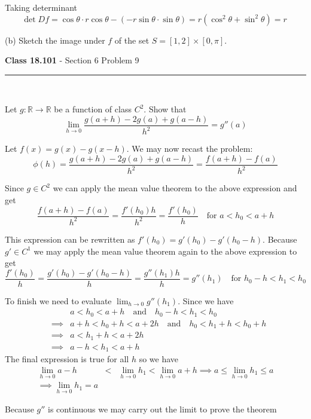 \documentclass[11pt,reqno]{article}
\begin{document}
\noindent Taking determinant
\[ \text{det} \; D f = \cos \theta \cdot r \cos \theta - ( - r \sin \theta \cdot \sin \theta ) = r ( \cos^2 \theta + \sin^2 \theta) = r \]

\noindent (b) Sketch the image under $f$ of the set $S = [1,2] \times [0,\pi]$. \\ 


\begin{flushleft} 
\textbf{Class 18.101} - Section 6 Problem 9\\
\rule{500pt}{1pt}\\
\end{flushleft} 

\noindent Let $g: \mathbb{R} \to \mathbb{R}$ be a function of class $C^2$. Show that 
\[ \lim_{h \to 0} \frac{g(a + h) - 2 g(a) + g(a - h)}{h^2}  = g''(a)\]

\noindent Let $f(x) = g(x) - g(x - h)$. We may now recast the problem:
\[ \phi(h) = \frac{g(a + h) - 2 g(a) + g(a - h)}{h^2} = \frac{f(a+h) - f(a)}{h^2} \]

\noindent Since $g \in C^2$ we can apply the mean value theorem to the above expression and get
\[ \frac{f(a+h) - f(a)}{h^2} = \frac{f'(h_0) h}{h^2} = \frac{f'(h_0)}{h} \quad \text{for $a < h_0 < a + h$} \]

This expression can be rewritten as $f'(h_0) = g'(h_0) - g'(h_0 - h)$. Because $g' \in C^1$ we may apply the mean value theorem again to the above expression to get 
\[  \frac{f'(h_0)}{h} =  \frac{g'(h_0) - g'(h_0 - h)}{h} = \frac{g''(h_1) h}{h} = g''(h_1) \quad \text{for $h_0 - h < h_1 < h_0$ } \]

To finish we need to evaluate $\lim_{h \to 0} g''(h_1)$. Since we have
\begin{eqnarray*}
& & a < h_0 < a + h \quad \text{and} \quad h_0 - h < h_1 < h_0 \\
& \implies & a + h < h_0 + h < a + 2 h \quad \text{and} \quad h_0 < h_1 + h < h_0 + h \\
& \implies & a < h_1 + h < a + 2 h \\
& \implies & a - h < h_1 < a + h 
\end{eqnarray*}
The final expression is true for all $h$ so we have
\begin{eqnarray*}
\lim_{h \to 0} a - h & < & \lim_{h \to 0} h_1 < \lim_{h \to 0} a + h \implies a \le \lim_{h \to 0} h_1 \le  a\\
\implies \lim_{h \to 0} h_1 = a
\end{eqnarray*}

\noindent Because $g''$ is continuous we may carry out the limit to prove the theorem
\end{document}
